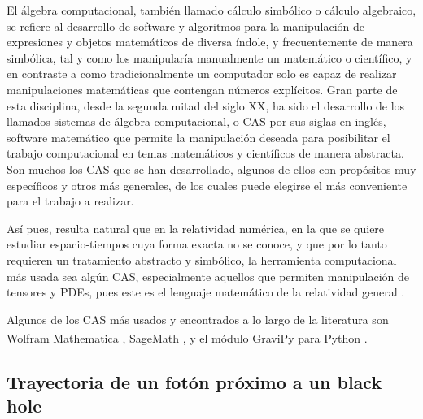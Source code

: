 \documentclass[%
 reprint,
 amsmath,amssymb,
 aps,
floatfix,
]{revtex4-1}
\begin{document}
El álgebra computacional, también llamado cálculo simbólico o cálculo algebraico, se refiere al desarrollo de software y algoritmos para la manipulación de expresiones y objetos matemáticos de diversa índole, y frecuentemente de manera simbólica, tal y como los manipularía manualmente un matemático o científico, y en contraste a como tradicionalmente un computador solo es capaz de realizar manipulaciones matemáticas que contengan números explícitos. Gran parte de esta disciplina, desde la segunda mitad del siglo XX, ha sido el desarrollo de los llamados sistemas de álgebra computacional, o CAS por sus siglas en inglés, software matemático que permite la manipulación deseada para posibilitar el trabajo computacional en temas matemáticos y científicos de manera abstracta. Son muchos los CAS que se han desarrollado, algunos de ellos con propósitos muy específicos y otros más generales, de los cuales puede elegirse el más conveniente para el trabajo a realizar.

Así pues, resulta natural que en la relatividad numérica, en la que se quiere estudiar espacio-tiempos cuya forma exacta no se conoce, y que por lo tanto requieren un tratamiento abstracto y simbólico, la herramienta computacional más usada sea algún CAS, especialmente aquellos que permiten manipulación de tensores y PDEs, pues este es el lenguaje matemático de la relatividad general \cite{Guzman2007IntroductionExamples, Heinicke2002ComputerGravity, MacCallum2018ComputerResearch, MacCallum2002ComputerRelativity}.

Algunos de los CAS más usados y encontrados a lo largo de la literatura son Wolfram Mathematica\textsuperscript{\textregistered} \cite{Baumann2005Mathematica2, HartleGravity:Relativity, Hrabovsky2014GeneralMathematica, Koberlein2013AstrophysicsSupport, Woszczyna2016SYMBOLICAPPROACH, Zimmerman2001GeneralMathematica}, SageMath \cite{Birkandan2019SymbolicSystems, Vankov2016GeneralTest}, y el módulo GraviPy para Python\textsuperscript{\textregistered} \cite{Birkandan2019SymbolicSystems, Woszczyna2016SYMBOLICAPPROACH}.

\subsection{Trayectoria de un fotón próximo a un black hole}
\end{document}
